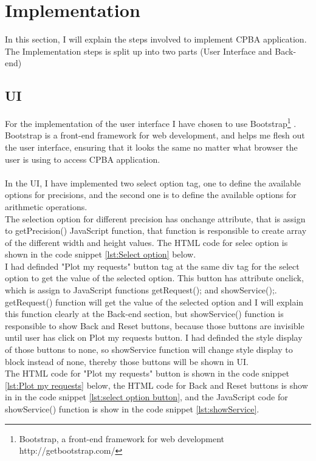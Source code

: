 \documentclass[11pt]{article}
\begin{document}
\section{Implementation}
In this section, I will explain the steps involved to implement CPBA application. The Implementation steps is split up into two parts (User Interface and Back-end)
\subsection{UI}
For the implementation of the user interface I have chosen to use Bootstrap\footnote{Bootstrap, a front-end framework for web development http://getbootstrap.com/} . Bootstrap is a front-end framework for web development, and helps me flesh out the user interface, ensuring that it looks the same no matter what browser the user is using to access CPBA application.\\\\
In the UI, I have implemented two select option tag, one to define the available options for precisions, and the second one is to define the available options for arithmetic operations.\\
The selection option for different precision has onchange attribute, that is assign to getPrecision() JavaScript function, that function is responsible to create array of the different width and height values. The HTML code for selec option is shown in the code snippet \ref{lst:Select option} below.\\

I had definded "Plot my requests" button tag at the same div tag for the select option to get the value of the selected option. This button has attribute onclick, which is assign to JavaScript functions getRequest(); and showService();. getRequest() function will get the value of the selected option and I will explain this function clearly at the Back-end section, but showService() function is responsible to show Back and Reset buttons, because those buttons are invisible until user has click on Plot my requests button. I had definded the style display of those buttons to none, so showService function will change style display to block instead of none, thereby those buttons will be shown in UI.\\
The HTML code for "Plot my requests" button is shown in the code snippet \ref{lst:Plot my requests} below, the HTML code for Back and Reset buttons is show in in the code snippet \ref{lst:select option button}, and the JavaScript code for showService() function is show in the code snippet \ref{lst:showService}.\\
\end{document}
